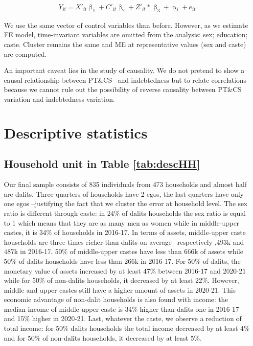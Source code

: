 \documentclass[a4paper, 11pt, onecolumn]{article}
\newcommand{\PTCS}{PT\&CS}
\begin{document}
\begin{equation}\label{eq:fe}
\begin{split}
Y_{it}=X'_{it}\upbeta_{1}+C'_{it}\upbeta_{2}+Z'_{it}*\upbeta_{3}+\upalpha_{i}+e_{it}
\end{split}
\end{equation}

We use the same vector of control variables than before.
However, as we estimate FE model, time-invariant variables are omitted from the analysis: sex; education; caste. 
Cluster remains the same and ME at representative values (sex and caste) are computed.

An important caveat lies in the study of causality.
We do not pretend to show a causal relationship between \PTCS~ and indebtedness but to relate correlations because we cannot rule out the possibility of reverse causality between \PTCS~ variation and indebtedness variation.



\section{Descriptive statistics}

	\subsection{Household unit in Table \ref{tab:descHH}}

Our final sample consists of 835 individuals from 473 households and almost half are dalits.
Three quarters of households have 2 egos, the last quarters have only one egos --justifying the fact that we cluster the error at household level.
The sex ratio is different through caste: in 24\% of dalits households the sex ratio is equal to 1 which means that they are as many men as women while in middle-upper castes, it is 34\% of households in 2016-17.
In terms of assets, middle-upper caste households are three times richer than dalits on average --respectively ,493k and \rupee487k in 2016-17.
50\% of middle-upper castes have less than \rupee666k of assets while 50\% of dalits households have less than \rupee266k in 2016-17.
For 50\% of dalits, the monetary value of assets increased by at least 47\% between 2016-17 and 2020-21 while for 50\% of non-dalits households, it decreased by at least 22\%.
However, middle and upper castes still have a higher amount of assets in 2020-21.
This economic advantage of non-dalit households is also found with income: the median income of middle-upper caste is 34\% higher than dalits one in 2016-17 and 15\% higher in 2020-21.
Last, whatever the caste, we observe a reduction of total income: for 50\% dalits households the total income decreased by at least 4\% and for 50\% of non-dalits households, it decreased by at least 5\%.
		
\end{document}
